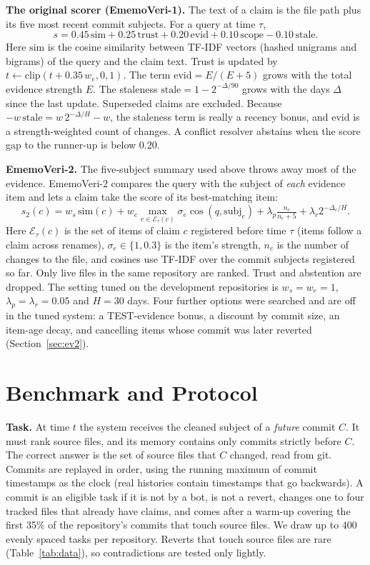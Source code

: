 \documentclass[conference]{IEEEtran}
\newcommand{\sys}{EmemoVeri}
\begin{document}
\textbf{The original scorer (\sys{}-1).} The text of a claim is the file path plus its five most recent commit subjects. For a query at time $\tau$,
\begin{equation}
s = 0.45\,\mathrm{sim} + 0.25\,\mathrm{trust} + 0.20\,\mathrm{evid} + 0.10\,\mathrm{scope} - 0.10\,\mathrm{stale}.
\end{equation}
Here $\mathrm{sim}$ is the cosine similarity between TF-IDF vectors (hashed unigrams and bigrams) of the query and the claim text. Trust is updated by $t\leftarrow\mathrm{clip}(t+0.35\,w_e,0,1)$. The term $\mathrm{evid}=E/(E+5)$ grows with the total evidence strength $E$. The staleness $\mathrm{stale}=1-2^{-\Delta/90}$ grows with the days $\Delta$ since the last update. Superseded claims are excluded. Because $-w\,\mathrm{stale}=w\,2^{-\Delta/H}-w$, the staleness term is really a recency bonus, and $\mathrm{evid}$ is a strength-weighted count of changes. A conflict resolver abstains when the score gap to the runner-up is below 0.20.

\textbf{\sys{}-2.} The five-subject summary used above throws away most of the evidence. \sys{}-2 compares the query with the subject of \emph{each} evidence item and lets a claim take the score of its best-matching item:
\begin{equation}
s_2(c)=w_s\,\mathrm{sim}(c)+w_e\max_{e\in\mathcal{E}_\tau(c)}\sigma_e\cos(q,\mathrm{subj}_e)+\lambda_p\tfrac{n_c}{n_c+5}+\lambda_r 2^{-\Delta_c/H}.
\end{equation}
Here $\mathcal{E}_\tau(c)$ is the set of items of claim $c$ registered before time $\tau$ (items follow a claim across renames), $\sigma_e\in\{1,0.3\}$ is the item's strength, $n_c$ is the number of changes to the file, and cosines use TF-IDF over the commit subjects registered so far. Only live files in the same repository are ranked. Trust and abstention are dropped. The setting tuned on the development repositories is $w_s=w_e=1$, $\lambda_p=\lambda_r=0.05$ and $H=30$ days. Four further options were searched and are off in the tuned system: a TEST-evidence bonus, a discount by commit size, an item-age decay, and cancelling items whose commit was later reverted (Section~\ref{sec:ev2}).

\section{Benchmark and Protocol}
\label{sec:bench}
\textbf{Task.} At time $t$ the system receives the cleaned subject of a \emph{future} commit $C$. It must rank source files, and its memory contains only commits strictly before $C$. The correct answer is the set of source files that $C$ changed, read from git. Commits are replayed in order, using the running maximum of commit timestamps as the clock (real histories contain timestamps that go backwards). A commit is an eligible task if it is not by a bot, is not a revert, changes one to four tracked files that already have claims, and comes after a warm-up covering the first 35\% of the repository's commits that touch source files. We draw up to 400 evenly spaced tasks per repository. Reverts that touch source files are rare (Table~\ref{tab:data}), so contradictions are tested only lightly.
\end{document}
